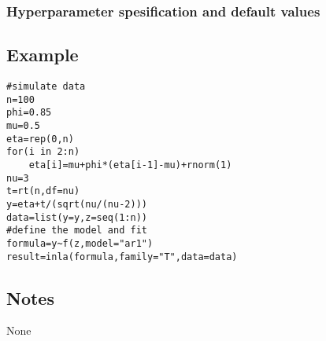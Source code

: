 \documentclass[a4paper,11pt]{article}
\begin{document}
\subsubsection*{Hyperparameter spesification and default values}


\subsection*{Example}
\begin{verbatim}
#simulate data
n=100
phi=0.85
mu=0.5
eta=rep(0,n)
for(i in 2:n)
    eta[i]=mu+phi*(eta[i-1]-mu)+rnorm(1)
nu=3
t=rt(n,df=nu)
y=eta+t/(sqrt(nu/(nu-2)))
data=list(y=y,z=seq(1:n))
#define the model and fit
formula=y~f(z,model="ar1")
result=inla(formula,family="T",data=data)
\end{verbatim}

\subsection*{Notes}
None
\end{document}
